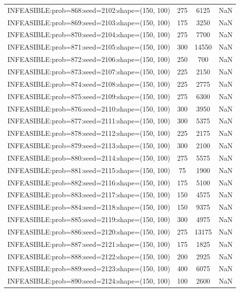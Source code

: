\begin{longtable}{lccc}
INFEASIBLE:prob=868:seed=2102:shape=(150, 100) &      275 &  6125 &    NaN \\
INFEASIBLE:prob=869:seed=2103:shape=(150, 100) &      175 &  3250 &    NaN \\
INFEASIBLE:prob=870:seed=2104:shape=(150, 100) &      275 &  7700 &    NaN \\
INFEASIBLE:prob=871:seed=2105:shape=(150, 100) &      300 & 14550 &    NaN \\
INFEASIBLE:prob=872:seed=2106:shape=(150, 100) &      250 &   700 &    NaN \\
INFEASIBLE:prob=873:seed=2107:shape=(150, 100) &      225 &  2150 &    NaN \\
INFEASIBLE:prob=874:seed=2108:shape=(150, 100) &      225 &  2775 &    NaN \\
INFEASIBLE:prob=875:seed=2109:shape=(150, 100) &      275 &  6300 &    NaN \\
INFEASIBLE:prob=876:seed=2110:shape=(150, 100) &      300 &  3950 &    NaN \\
INFEASIBLE:prob=877:seed=2111:shape=(150, 100) &      300 &  5375 &    NaN \\
INFEASIBLE:prob=878:seed=2112:shape=(150, 100) &      225 &  2175 &    NaN \\
INFEASIBLE:prob=879:seed=2113:shape=(150, 100) &      300 &  2100 &    NaN \\
INFEASIBLE:prob=880:seed=2114:shape=(150, 100) &      275 &  5575 &    NaN \\
INFEASIBLE:prob=881:seed=2115:shape=(150, 100) &       75 &  1900 &    NaN \\
INFEASIBLE:prob=882:seed=2116:shape=(150, 100) &      175 &  5100 &    NaN \\
INFEASIBLE:prob=883:seed=2117:shape=(150, 100) &      150 &  4575 &    NaN \\
INFEASIBLE:prob=884:seed=2118:shape=(150, 100) &      150 &  9375 &    NaN \\
INFEASIBLE:prob=885:seed=2119:shape=(150, 100) &      300 &  4975 &    NaN \\
INFEASIBLE:prob=886:seed=2120:shape=(150, 100) &      275 & 13175 &    NaN \\
INFEASIBLE:prob=887:seed=2121:shape=(150, 100) &      175 &  1825 &    NaN \\
INFEASIBLE:prob=888:seed=2122:shape=(150, 100) &      200 &  2925 &    NaN \\
INFEASIBLE:prob=889:seed=2123:shape=(150, 100) &      400 &  6075 &    NaN \\
INFEASIBLE:prob=890:seed=2124:shape=(150, 100) &      100 &  2600 &    NaN \\

\end{longtable}

